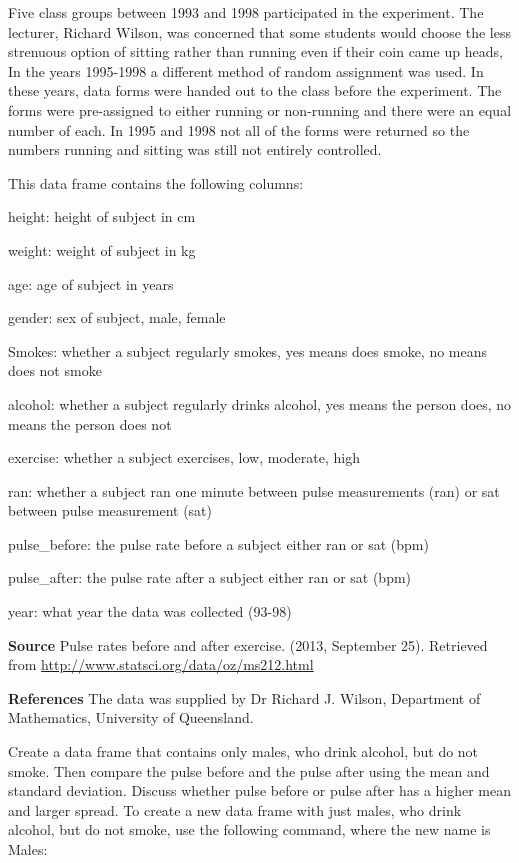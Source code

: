 \documentclass[]{book}
\begin{document}
Five class groups between 1993 and 1998 participated in the experiment. The lecturer, Richard Wilson, was concerned that some students would choose the less strenuous option of sitting rather than running even if their coin came up heads, In the years 1995-1998 a different method of random assignment was used. In these years, data forms were handed out to the class before the experiment. The forms were pre-assigned to either running or non-running and there were an equal number of each. In 1995 and 1998 not all of the forms were returned so the numbers running and sitting was still not entirely controlled.

This data frame contains the following columns:

height: height of subject in cm

weight: weight of subject in kg

age: age of subject in years

gender: sex of subject, male, female

Smokes: whether a subject regularly smokes, yes means does smoke, no means does not smoke

alcohol: whether a subject regularly drinks alcohol, yes means the person does, no means the person does not

exercise: whether a subject exercises, low, moderate, high

ran: whether a subject ran one minute between pulse measurements (ran) or sat between pulse measurement (sat)

pulse\_before: the pulse rate before a subject either ran or sat (bpm)

pulse\_after: the pulse rate after a subject either ran or sat (bpm)

year: what year the data was collected (93-98)

\textbf{Source}
Pulse rates before and after exercise. (2013, September 25). Retrieved from
\url{http://www.statsci.org/data/oz/ms212.html}

\textbf{References}
The data was supplied by Dr Richard J. Wilson, Department of Mathematics, University of Queensland.

Create a data frame that contains only males, who drink alcohol, but do not smoke. Then compare the pulse before and the pulse after using the mean and standard deviation. Discuss whether pulse before or pulse after has a higher mean and larger spread. To create a new data frame with just males, who drink alcohol, but do not smoke, use the following command, where the new name is Males:
\end{document}
